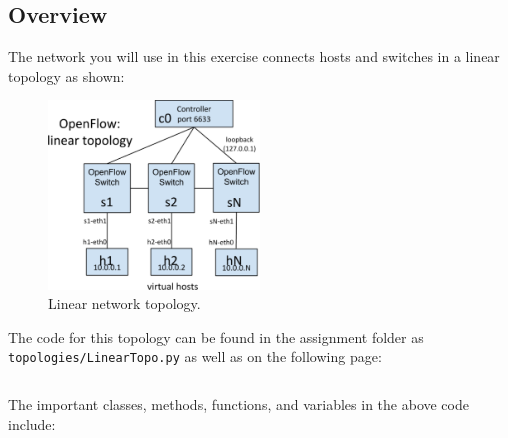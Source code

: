 \documentclass{article}
\begin{document}
\subsection{Overview}

The network you will use in this exercise connects hosts and switches in a linear topology as shown:

\begin{figure}[H]
    \centering
    \includegraphics[width=0.5\textwidth]{img/linear_topology.png}
    \caption{Linear network topology.}
    \label{fig:linear_topology}
\end{figure}

\noindent
The code for this topology can be found in the assignment folder as \nolinkurl{topologies/LinearTopo.py} as well as on the following page:

\newpage
\inputminted[fontsize=\footnotesize]{python}{topologies/LinearTopo.py}
\newpage
\noindent
The important classes, methods, functions, and variables in the above code include:
\end{document}

